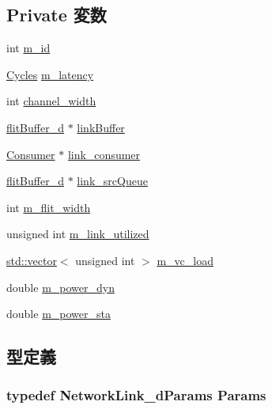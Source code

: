 \subsection*{Private 変数}
\begin{DoxyCompactItemize}
\item 
int \hyperlink{classNetworkLink__d_aad966617e7e050bedbead762727808a5}{m\_\-id}
\item 
\hyperlink{classCycles}{Cycles} \hyperlink{classNetworkLink__d_a7599697a6c831356525c7d97604edd31}{m\_\-latency}
\item 
int \hyperlink{classNetworkLink__d_a8794670a013fb6bce1e4d5aad3c4bda3}{channel\_\-width}
\item 
\hyperlink{classflitBuffer__d}{flitBuffer\_\-d} $\ast$ \hyperlink{classNetworkLink__d_ab66d22f6702b5d94f0386fb5283a0450}{linkBuffer}
\item 
\hyperlink{classConsumer}{Consumer} $\ast$ \hyperlink{classNetworkLink__d_a87c8a0d1845e8273c39198a522e4fc8c}{link\_\-consumer}
\item 
\hyperlink{classflitBuffer__d}{flitBuffer\_\-d} $\ast$ \hyperlink{classNetworkLink__d_a565ed40a0567a577fd65cf0a51df5faf}{link\_\-srcQueue}
\item 
int \hyperlink{classNetworkLink__d_a4f9ea520dc19ecb47ff8323ad06d7ca5}{m\_\-flit\_\-width}
\item 
unsigned int \hyperlink{classNetworkLink__d_a162630f24b6fc6b9e9ffe54d023c9104}{m\_\-link\_\-utilized}
\item 
\hyperlink{classstd_1_1vector}{std::vector}$<$ unsigned int $>$ \hyperlink{classNetworkLink__d_a929bb11421a47667a05e8e94e6d8ccd2}{m\_\-vc\_\-load}
\item 
double \hyperlink{classNetworkLink__d_a09287c991c636cbc01e82cd7d3f73dc2}{m\_\-power\_\-dyn}
\item 
double \hyperlink{classNetworkLink__d_afe7b7b86afd10caa5129c26f7428e2b1}{m\_\-power\_\-sta}
\end{DoxyCompactItemize}


\subsection{型定義}
\hypertarget{classNetworkLink__d_a1384b11c71bbcc86aab6a3a201f7a51e}{
\subsubsection[{Params}]{\setlength{\rightskip}{0pt plus 5cm}typedef NetworkLink\_\-dParams {\bf Params}}}
\label{classNetworkLink__d_a1384b11c71bbcc86aab6a3a201f7a51e}


